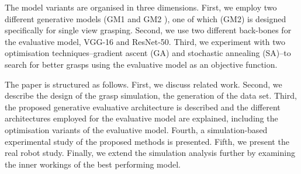 The model variants are organised in three dimensions. First, we employ two different generative models (GM1 \cite{kopicki2015ijrr} and GM2 \cite{kopicki2019ijrr}), one of which (GM2) is designed specifically for single view grasping. Second, we use two different back-bones for the evaluative model, VGG-16 and ResNet-50. Third, we experiment with two optimisation techniques--gradient ascent (GA) and stochastic annealing (SA)--to search for better grasps using the evaluative model as an objective function.



The paper is structured as follows. First, we discuss related work. Second, we describe the design of the grasp simulation, the generation of the data set. Third, the proposed generative evaluative architecture is described and the different architectures employed for the evaluative model are explained, including the optimisation variants of the evaluative model. Fourth, a simulation-based experimental study of the proposed methods is presented. Fifth, we present the real robot study. Finally, we extend the simulation analysis further by examining the inner workings of the best performing model. 
